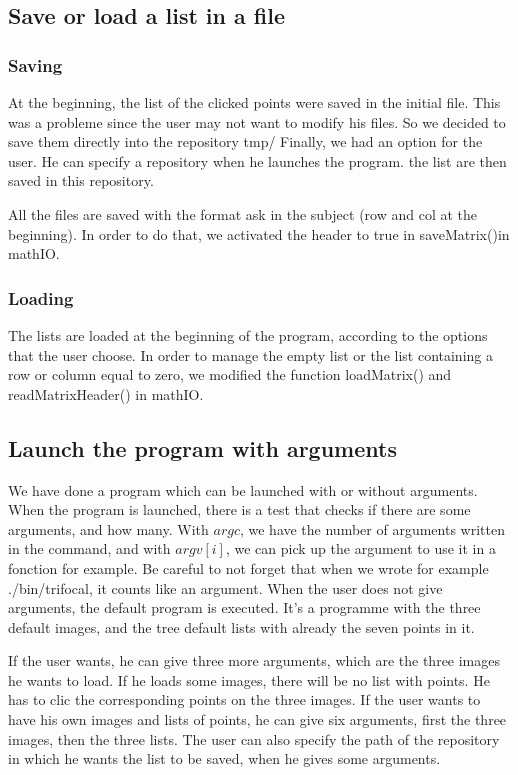 \documentclass{report}
\begin{document}
\subsection{Save or load a list in a file}
\subsubsection{Saving}
At the beginning, the list of the clicked points were saved in the initial file. This was a probleme since the user may not want to modify his files. 
So we decided to save them directly into the repository tmp/ 
Finally, we had an option for the user. He can specify a repository when he launches the program. the list are then saved in this repository. 

All the files are saved with the format ask in the subject (row and col at the beginning). In order to do that, we activated the header to true in saveMatrix()in mathIO. 

\subsubsection{Loading}
The lists are loaded at the beginning of the program, according to the options that the user choose. In order to manage the empty list or the list containing a row or column equal to zero, we modified the function loadMatrix() and readMatrixHeader() in mathIO. 

\subsection{Launch the program with arguments}
We have done a program which can be launched with or without arguments. When the program is launched, there is a test that checks if there are some arguments, and how many. With $argc$, we have the number of arguments written in the command, and with $argv[i]$, we can pick up the argument to use it in a fonction for example.
Be careful to not forget that when we wrote for example ./bin/trifocal, it counts like an argument.
When the user does not give arguments, the default program is executed. It's a programme with the three default images, and the tree default lists with already the seven points in it.


If the user wants, he can give three more arguments, which are the three images he wants to load. If he loads some images, there will be no list with points. He has to clic the corresponding points on the three images. 
If the user wants to have his own images and lists of points, he can give six arguments, first the three images, then the three lists. 
The user can also specify the path of the repository in which he wants the list to be saved, when he gives some arguments. 
\end{document}
